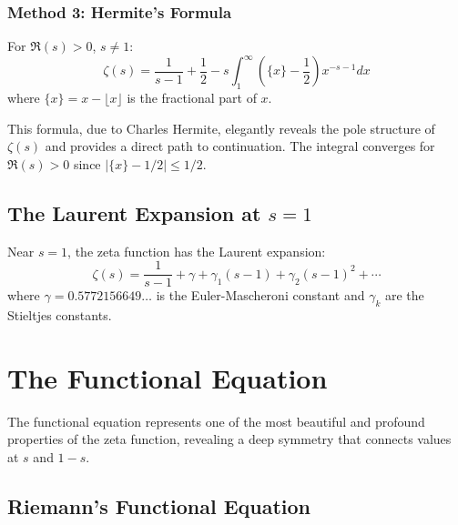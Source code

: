 \subsubsection{Method 3: Hermite's Formula}

\begin{theorem}
\label{thm:hermite_formula}
For $\Re(s) > 0$, $s \neq 1$:
\begin{equation}
\zeta(s) = \frac{1}{s-1} + \frac{1}{2} - s \int_1^{\infty} \left(\{x\} - \frac{1}{2}\right) x^{-s-1} dx
\label{eq:hermite_formula}
\end{equation}
where $\{x\} = x - \lfloor x \rfloor$ is the fractional part of $x$.
\end{theorem}

\begin{historicalnote}
This formula, due to Charles Hermite, elegantly reveals the pole structure of $\zeta(s)$ and provides a direct path to continuation. The integral converges for $\Re(s) > 0$ since $|\{x\} - 1/2| \leq 1/2$.
\end{historicalnote}

\subsection{The Laurent Expansion at $s = 1$}

\begin{theorem}
\label{thm:laurent_expansion}
Near $s = 1$, the zeta function has the Laurent expansion:
\begin{equation}
\zeta(s) = \frac{1}{s-1} + \gamma + \gamma_1(s-1) + \gamma_2(s-1)^2 + \cdots
\label{eq:laurent_expansion}
\end{equation}
where $\gamma = 0.5772156649\ldots$ is the Euler-Mascheroni constant and $\gamma_k$ are the Stieltjes constants.
\end{theorem}

\section{The Functional Equation}
\label{sec:functional_equation}

The functional equation represents one of the most beautiful and profound properties of the zeta function, revealing a deep symmetry that connects values at $s$ and $1-s$.

\subsection{Riemann's Functional Equation}

